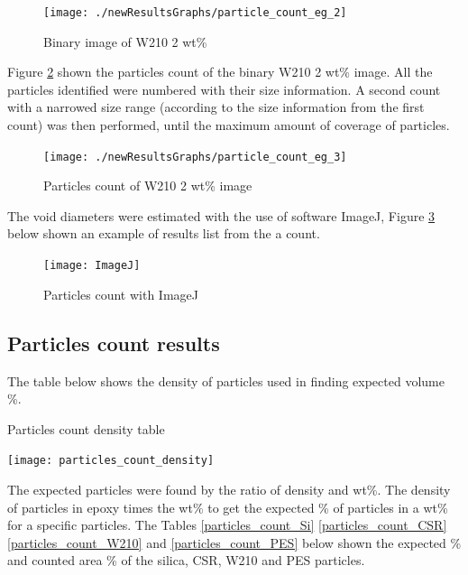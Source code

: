 \documentclass[numbers=noendperiod,chapterprefix=on]{icldt} %
\begin{document}
{\begin{figure}[!hp]
\centering
\texttt{[image: ./newResultsGraphs/particle\_count\_eg\_2]}
\caption{Binary image of W210 2 wt\%} \label{particle_count_eg_2}
\end{figure}
\FloatBarrier

Figure \ref{particle_count_eg_3} shown the particles count of the binary W210 2 wt\% image.
All the particles identified were numbered with their size information. A second count with a narrowed size range (according to the size information from the first count) was then performed, until the maximum amount of coverage of particles.
  
\begin{figure}[!hp]
\centering
\texttt{[image: ./newResultsGraphs/particle\_count\_eg\_3]}
\caption{Particles count of W210 2 wt\% image} \label{particle_count_eg_3}
\end{figure}
\FloatBarrier


The void diameters were estimated with the use of software ImageJ, Figure \ref{ImageJ} below shown an example of results list from the a count. 

\begin{figure}[!htpb]
\centering
\texttt{[image: ImageJ]}
\caption{Particles count with ImageJ} \label{ImageJ}
\end{figure}
\FloatBarrier

\subsection{Particles count results}
The table   below shows the density of particles used in finding expected volume \%.

\begin{table}[!htpb]
\centering
\caption{Particles count density table} \label{particles_count_density}
\texttt{[image: particles\_count\_density]}
\end{table}
\FloatBarrier

The expected particles were found by the ratio of density and wt\%. The density of particles in epoxy times the wt\% to get the expected \% of particles in a wt\% for a specific particles. The Tables \ref{particles_count_Si}
\ref{particles_count_CSR}
\ref{particles_count_W210} and 
\ref{particles_count_PES}
below shown the expected \% and counted area \% of the silica, CSR, W210 and PES particles.

}
\end{document}
